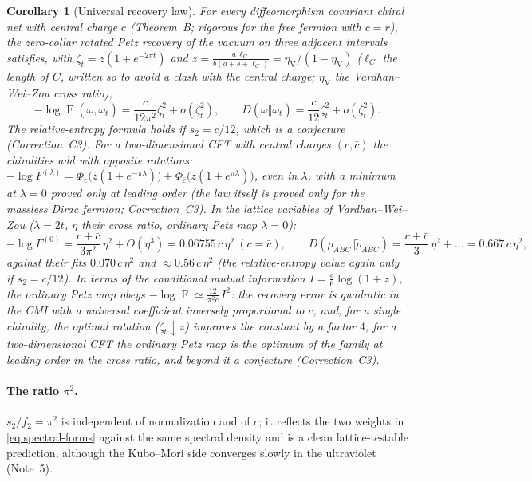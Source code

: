 \documentclass[11pt]{article}
\theoremstyle{accent}
\newtheorem{corollary}[theorem]{Corollary}
\theoremstyle{definition}
\newcommand{\Fid}{\operatorname{F}}
\begin{document}
\begin{corollary}[Universal recovery law]\label{cor:law}
For every diffeomorphism covariant chiral net with central charge \(c\) (Theorem~B; rigorous for the free fermion with \(c=r\)), the zero-collar rotated Petz recovery of the vacuum on three adjacent intervals satisfies, with \(\zeta_t=z(1+e^{-2\pi t})\) and \(z=\frac{a\,\ell_C}{b(a+b+\ell_C)}=\eta_{\mathrm V}/(1-\eta_{\mathrm V})\) (\(\ell_C\) the length of \(C\), written so to avoid a clash with the central charge; \(\eta_{\mathrm V}\) the Vardhan--Wei--Zou cross ratio),
\[
 -\log\Fid(\omega,\widetilde\omega_t)=\frac{c}{12\pi^2}\zeta_t^2+o(\zeta_t^2),\qquad
 D(\omega\Vert\widetilde\omega_t)=\frac{c}{12}\zeta_t^2+o(\zeta_t^2).
\]
The relative-entropy formula holds if \(s_2=c/12\), which is a conjecture (Correction~C3).  For a two-dimensional CFT with central charges \((c,\bar c)\) the chiralities add with opposite rotations: \(-\log F^{(\lambda)}=\Phi_c\bigl(z(1+e^{-\pi\lambda})\bigr)+\Phi_{\bar c}\bigl(z(1+e^{\pi\lambda})\bigr)\), even in \(\lambda\), with a minimum at \(\lambda=0\) proved only at leading order (the law itself is proved only for the massless Dirac fermion; Correction~C3).  In the lattice variables of Vardhan--Wei--Zou (\(\lambda=2t\), \(\eta\) their cross ratio, ordinary Petz map \(\lambda=0\)):
\[
 -\log F^{(0)}=\frac{c+\bar c}{3\pi^2}\,\eta^2+O(\eta^3)=0.06755\,c\,\eta^2\ (c=\bar c),\qquad
 D(\rho_{ABC}\Vert\widetilde\rho_{ABC})=\frac{c+\bar c}{3}\,\eta^2+\dots=0.667\,c\,\eta^2,
\]
against their fits \(0.070\,c\,\eta^2\) and \(\approx0.56\,c\,\eta^2\) (the relative-entropy value again only if \(s_2=c/12\)).  In terms of the conditional mutual information \(I=\frac c6\log(1+z)\), the ordinary Petz map obeys \(-\log\Fid\simeq\frac{12}{\pi^2c}\,I^2\): the recovery error is quadratic in the CMI with a universal coefficient inversely proportional to \(c\), and, for a single chirality, the optimal rotation (\(\zeta_t\downarrow z\)) improves the constant by a factor \(4\); for a two-dimensional CFT the ordinary Petz map is the optimum of the family at leading order in the cross ratio, and beyond it a conjecture (Correction~C3).
\end{corollary}

\paragraph{The ratio \(\pi^2\).}
\(s_2/f_2=\pi^2\) is independent of normalization and of \(c\); it reflects the two weights in \eqref{eq:spectral-forms} against the same spectral density and is a clean lattice-testable prediction, although the Kubo--Mori side converges slowly in the ultraviolet (Note~5).
\end{document}
